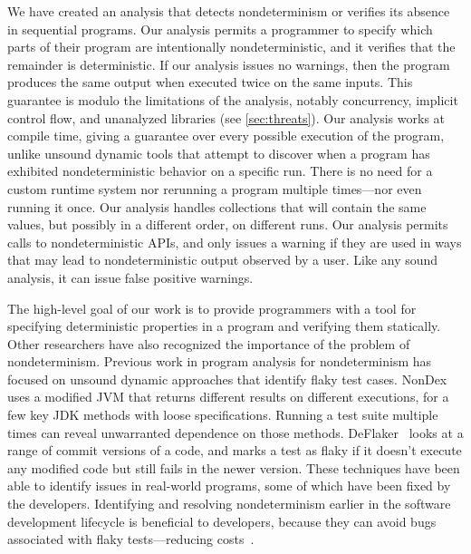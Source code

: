 We have created an analysis that detects nondeterminism or verifies its
absence in sequential programs.
Our analysis permits a programmer to specify which parts of their program
are intentionally nondeterministic, and it verifies that the remainder is deterministic.
%
If our analysis issues no warnings, then the program produces the same
output when executed twice on the same inputs.  This guarantee is modulo
the limitations of the
analysis, notably concurrency, implicit control flow, and unanalyzed libraries (see \cref{sec:threats}).
%
Our analysis works at compile time, giving a guarantee over every possible
execution of the program, unlike unsound dynamic tools that attempt
to discover when a program has exhibited nondeterministic behavior on a
specific run.  There is no need for a custom runtime system nor
rerunning a program multiple times---nor even running it once.
%
Our analysis handles collections that will contain the same values, but
possibly in a different order, on different runs.
%
Our analysis permits calls to
nondeterministic APIs, and only issues a warning if they are used in ways
that may lead to nondeterministic output observed by a user.  Like any
sound analysis, it can issue false positive warnings.



The high-level goal of our work is to provide programmers with a tool for
specifying deterministic properties in a program and verifying them
statically.
%
Other researchers have also recognized the importance of the problem of nondeterminism.
Previous work in program analysis for nondeterminism has focused on unsound dynamic
approaches that identify flaky test cases.
NonDex~\cite{nondex} uses a modified JVM that returns different results on different
executions, for a few key JDK methods with loose specifications.  Running a
test suite multiple times can reveal unwarranted dependence on those
methods.
DeFlaker~\cite{deflaker} looks at a range of commit versions
of a code, and marks a test as flaky if it doesn't execute any modified code but still fails in the newer version. These techniques
have been able to identify issues in real-world programs, some of which
have been fixed by the developers. Identifying and
resolving nondeterminism
earlier in the software development lifecycle is beneficial to
developers, because they can avoid bugs associated with flaky tests---reducing
costs~\cite{briski2008minimizing}.


